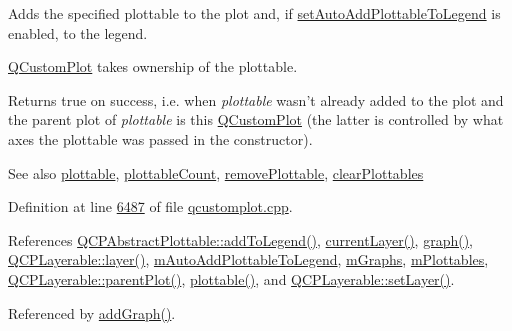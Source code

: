 Adds the specified plottable to the plot and, if \hyperlink{a00116_ad8858410c2db47b7104040a3aa61c3fc}{set\+Auto\+Add\+Plottable\+To\+Legend} is enabled, to the legend. 

\hyperlink{a00030_d8/d00/a00186}{Q\+Custom\+Plot} takes ownership of the plottable.

Returns true on success, i.\+e. when {\itshape plottable} wasn't already added to the plot and the parent plot of {\itshape plottable} is this \hyperlink{a00030_d8/d00/a00186}{Q\+Custom\+Plot} (the latter is controlled by what axes the plottable was passed in the constructor).

\begin{DoxySeeAlso}{See also}
\hyperlink{a00116_afe26a6b79add0a11ae52f5700534ddb7}{plottable}, \hyperlink{a00116_a2dbfbf15dc38713f9a1c445a3dd2e989}{plottable\+Count}, \hyperlink{a00116_afc210e0021480f8119bccf37839dbcc8}{remove\+Plottable}, \hyperlink{a00116_a9a409bb3201878adb7ffba1c89c4e004}{clear\+Plottables} 
\end{DoxySeeAlso}


Definition at line \hyperlink{a00115_source_l06487}{6487} of file \hyperlink{a00115_source}{qcustomplot.\+cpp}.



References \hyperlink{a00115_source_l08618}{Q\+C\+P\+Abstract\+Plottable\+::add\+To\+Legend()}, \hyperlink{a00115_source_l06984}{current\+Layer()}, \hyperlink{a00116_ac6b19830ab0f0073ff3089cf7c9b3c2e}{graph()}, \hyperlink{a00116_source_l00330}{Q\+C\+P\+Layerable\+::layer()}, \hyperlink{a00116_source_l02113}{m\+Auto\+Add\+Plottable\+To\+Legend}, \hyperlink{a00116_source_l02116}{m\+Graphs}, \hyperlink{a00116_source_l02115}{m\+Plottables}, \hyperlink{a00116_source_l00329}{Q\+C\+P\+Layerable\+::parent\+Plot()}, \hyperlink{a00116_a5c198d46ea2a2255a1b73e2c590f0364}{plottable()}, and \hyperlink{a00115_source_l14027}{Q\+C\+P\+Layerable\+::set\+Layer()}.



Referenced by \hyperlink{a00115_source_l06688}{add\+Graph()}.


